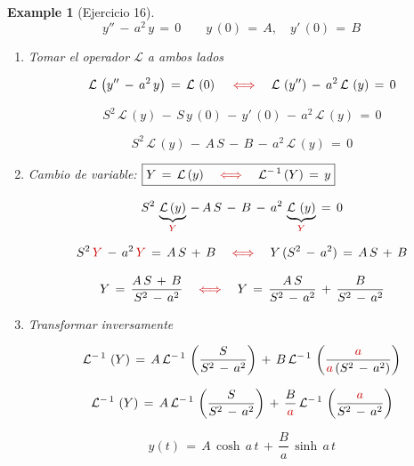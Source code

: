 \documentclass[a4paper,11pt,openany]{book}
\newtheorem{exmp}{Example}[section]
\newcommand*{\itembolasazules}[1]{%
\footnotesize\protect\tikz[baseline=-3pt]%
\protect\node[scale=.7, circle, shade, ball
color=green]{\color{white}\Large\bf#1};}
\begin{document}
\begin{exmp}[Ejercicio 16]

$$y''\,-\,a^{2}\,y\,=\,0 \qquad y\,(0)\,=\,A, \quad y'\,(0)\,=\,B$$
 
\begin{enumerate}[label=\itembolasazules{\arabic*}]
 
 
\item Tomar el operador $\mathcal{L}$ a ambos lados
 
$$\mathcal{L}\,\left(y''\,-\,a^{2}\,y \right)\,=\,\mathcal{L}\,\left(0 \right) \quad \textcolor{bostonuniversityred}{\iff} \quad \mathcal{L}\,\left(y'' \right)\,-\,a^{2}\,\mathcal{L}\,\left(y \right)\,=\,0$$
 
$$S^{2}\,\mathcal{L}\,(y)\,-\,S\,y\,(0)\,-\,y'\,(0)\,-\,a^{2}\,\mathcal{L}\,\left(y \right)\,=\,0 $$
 
$$S^{2}\,\mathcal{L}\,(y)\,-\,A\,S\,-\,B\,-\,a^{2}\,\mathcal{L}\,\left(y \right)\,=\,0 $$
 
\item Cambio de variable: $\boxed{Y\,=\,\mathcal{L}\,(y) \quad \textcolor{bostonuniversityred}{\iff} \quad \mathcal{L}^{-\,1}\,(Y)\,=\,y  }$
 
$$S^{2}\,\underbrace{\mathcal{L}\,(y)}_{\textcolor{bostonuniversityred}{Y}}\,-\,A\,S\,-\,B\,-\,a^{2}\,\underbrace{\mathcal{L}\,\left(y \right)}_{\textcolor{bostonuniversityred}{Y}}\,=\,0 $$
 
$$S^{2}\,\textcolor{bostonuniversityred}{Y}\,-\,a^{2}\,\textcolor{bostonuniversityred}{Y}\,=\,A\,S\,+\,B \quad \textcolor{bostonuniversityred}{\iff} \quad Y\,(S^{2}\,-\,a^{2})\,=\,A\,S\,+\,B$$
 
$$Y\,=\,\dfrac{A\,S\,+\,B}{S^{2}\,-\,a^{2}} \quad \textcolor{bostonuniversityred}{\iff} \quad Y\,=\,\dfrac{A\,S}{S^{2}\,-\,a^{2}}\,+\,\dfrac{B}{S^{2}\,-\,a^{2}}$$
 
\item Transformar inversamente 
 
$$\mathcal{L}^{-\,1}\,\left(Y \right)\,=\,A\,\mathcal{L}^{-\,1}\,\left(\dfrac{S}{S^{2}\,-\,a^{2}} \right)\,+\,B\,\mathcal{L}^{-\,1}\,\left(\dfrac{\textcolor{bostonuniversityred}{a}}{\textcolor{bostonuniversityred}{a}\,(S^{2}\,-\,a^{2})} \right)$$
 
$$\mathcal{L}^{-\,1}\,\left(Y \right)\,=\,A\,\mathcal{L}^{-\,1}\,\left(\dfrac{S}{S^{2}\,-\,a^{2}} \right)\,+\,\dfrac{B}{\textcolor{bostonuniversityred}{a}}\,\mathcal{L}^{-\,1}\,\left(\dfrac{\textcolor{bostonuniversityred}{a}}{S^{2}\,-\,a^{2}} \right)$$
 
$$\boxed{y(t)\,=\,A\,\cosh\,a\,t\,+\,\dfrac{B}{a}\,\sinh\,a\,t}$$
 
\end{enumerate}

\end{exmp}
\end{document}
